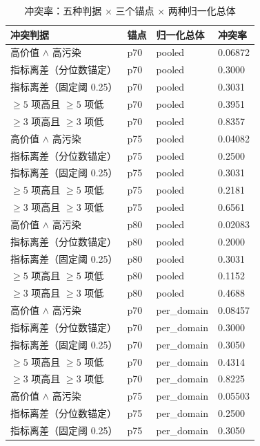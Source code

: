 \begin{table}[htbp]
  \centering
  \caption{冲突率：五种判据 $\times$ 三个锚点 $\times$ 两种归一化总体}
  \label{tab:app-q1-conflict}
  \small
  \begin{tabular}{@{}llll@{}}
    \toprule
    冲突判据 & 锚点 & 归一化总体 & 冲突率 \\
    \midrule
    高价值 $\wedge$ 高污染 & p70 & pooled & 0.06872 \\
    指标离差（分位数锚定） & p70 & pooled & 0.3000 \\
    指标离差（固定阈 0.25） & p70 & pooled & 0.3031 \\
    $\ge 5$ 项高且 $\ge 5$ 项低 & p70 & pooled & 0.3951 \\
    $\ge 3$ 项高且 $\ge 3$ 项低 & p70 & pooled & 0.8357 \\
    高价值 $\wedge$ 高污染 & p75 & pooled & 0.04082 \\
    指标离差（分位数锚定） & p75 & pooled & 0.2500 \\
    指标离差（固定阈 0.25） & p75 & pooled & 0.3031 \\
    $\ge 5$ 项高且 $\ge 5$ 项低 & p75 & pooled & 0.2181 \\
    $\ge 3$ 项高且 $\ge 3$ 项低 & p75 & pooled & 0.6561 \\
    高价值 $\wedge$ 高污染 & p80 & pooled & 0.02083 \\
    指标离差（分位数锚定） & p80 & pooled & 0.2000 \\
    指标离差（固定阈 0.25） & p80 & pooled & 0.3031 \\
    $\ge 5$ 项高且 $\ge 5$ 项低 & p80 & pooled & 0.1152 \\
    $\ge 3$ 项高且 $\ge 3$ 项低 & p80 & pooled & 0.4688 \\
    高价值 $\wedge$ 高污染 & p70 & per\_domain & 0.08457 \\
    指标离差（分位数锚定） & p70 & per\_domain & 0.3000 \\
    指标离差（固定阈 0.25） & p70 & per\_domain & 0.3050 \\
    $\ge 5$ 项高且 $\ge 5$ 项低 & p70 & per\_domain & 0.4314 \\
    $\ge 3$ 项高且 $\ge 3$ 项低 & p70 & per\_domain & 0.8225 \\
    高价值 $\wedge$ 高污染 & p75 & per\_domain & 0.05503 \\
    指标离差（分位数锚定） & p75 & per\_domain & 0.2500 \\
    指标离差（固定阈 0.25） & p75 & per\_domain & 0.3050 \\

\end{tabular}
\end{table}
